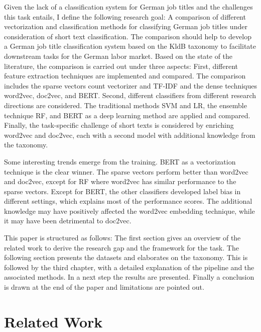 \documentclass[12pt, a4paper, titlepage]{article}
\begin{document}
Given the lack of a classification system for German job titles and the challenges this task entails, I define the following research goal: A comparison of different vectorization and classification methods for classifying German job titles under consideration of short text classification. The comparison should help to develop a German job title classification system based on the \ac{KldB} taxonomy to facilitate downstream tasks for the German labor market. Based on the state of the literature, the comparison is carried out under three aspects: First, different feature extraction techniques are implemented and compared. The comparison includes the sparse vectors count vectorizer and \ac{TF-IDF} and the dense techniques word2vec, doc2vec, and \ac{BERT}. Second, different classifiers from different research directions are considered. The traditional methods \ac{SVM} and \ac{LR}, the ensemble technique \ac{RF}, and \ac{BERT} as a deep learning method are applied and compared. Finally, the task-specific challenge of short texts is considered by enriching word2vec and doc2vec, each with a second model with additional knowledge from the taxonomy. 

Some interesting trends emerge from the training. \ac{BERT} as a vectorization technique is the clear winner. The sparse vectors perform better than word2vec and doc2vec, except for \ac{RF} where word2vec has similar performance to the sparse vectors. Except for \ac{BERT}, the other classifiers developed label bias in different settings, which explains most of the performance scores. The additional knowledge may have positively affected the word2vec embedding technique, while it may have been detrimental to doc2vec. 

This paper is structured as follows: The first section gives an overview of the related work to derive the research gap and the framework for the task. The following section presents the datasets and elaborates on the taxonomy. This is followed by the third chapter, with a detailed explanation of the pipeline and the associated methods. In a next step the results are presented. Finally a conclusion is drawn at the end of the paper and limitations are pointed out. 

\section{Related Work}
\end{document}
